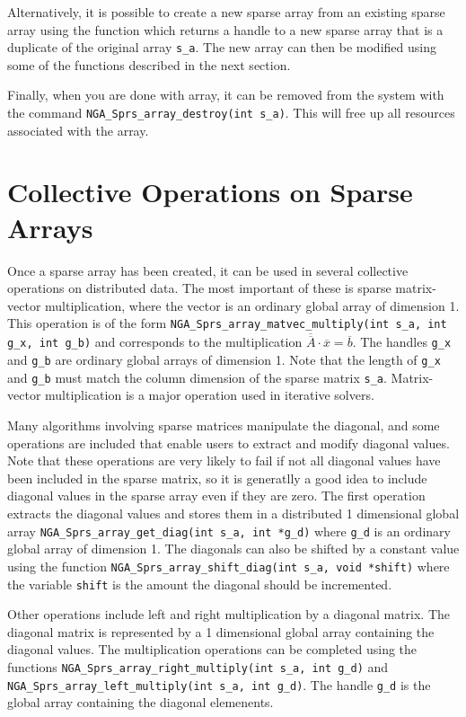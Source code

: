 Alternatively, it is possible to create a new sparse array from an existing
sparse array using the function 
which returns a handle to a new sparse array that is a duplicate of the original
array \texttt{s\_a}. The new array can then be modified using some of the
functions described in the next section.

Finally, when you are done with array, it can be removed from the system with
the command \texttt{NGA\_Sprs\_array\_destroy(int s\_a)}. This will free up all
resources associated with the array.

\section{Collective Operations on Sparse Arrays}

Once a sparse array has been created, it can be used in several collective
operations on distributed data. The most important of these is sparse
matrix-vector multiplication, where the vector is an ordinary global array of
dimension 1. This operation is of the form
\texttt{NGA\_Sprs\_array\_matvec\_multiply(int s\_a, int g\_x, int g\_b)}
and corresponds to the multiplication $\overline{\overline{A}}\cdot\overline{x}
=\overline{b}$. The handles \texttt{g\_x} and \texttt{g\_b} are ordinary global
arrays of dimension 1. Note that the length of \texttt{g\_x} and \texttt{g\_b}
must match the column dimension of the sparse matrix \texttt{s\_a}. Matrix-vector
multiplication is a major operation used in iterative solvers.

Many algorithms involving sparse matrices manipulate the diagonal,
and some operations are included that enable users to extract and modify
diagonal values. Note that these operations are very likely to fail if not all
diagonal values have been included in the sparse matrix, so it is generatlly a
good idea to include diagonal values in the sparse array even if they are zero.
The first operation extracts the diagonal values and stores them in a
distributed 1 dimensional global array \texttt{NGA\_Sprs\_array\_get\_diag(int
s\_a, int *g\_d)} where \texttt{g\_d} is an ordinary global array of dimension
1.  The diagonals can also be shifted by a constant value using the function
\texttt{NGA\_Sprs\_array\_shift\_diag(int s\_a, void *shift)} where the variable
\texttt{shift} is the amount the diagonal should be incremented.

Other operations include left and right multiplication by a diagonal matrix. The
diagonal matrix is represented by a 1 dimensional global array containing the
diagonal values. The multiplication operations can be completed using the
functions \texttt{NGA\_Sprs\_array\_right\_multiply(int s\_a, int g\_d)} and
\texttt{NGA\_Sprs\_array\_left\_multiply(int s\_a, int g\_d)}. The handle
\texttt{g\_d} is the global array containing the diagonal elemenents.

